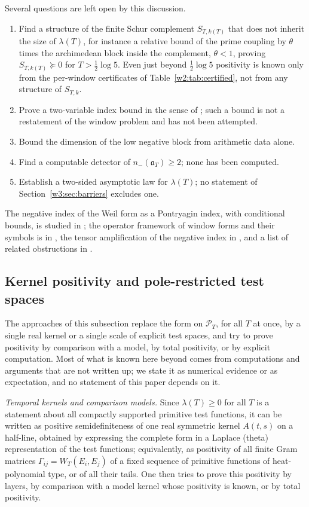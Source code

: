 \documentclass[11pt]{amsart}
\theoremstyle{definition}
\theoremstyle{remark}
\numberwithin{equation}{section}
\newcommand{\PT}{\mathcal{P}_T}                        %
\newcommand{\aT}{\mathfrak{a}_T}                       %
\newcommand{\WT}{W_T}                                  %
\newcommand{\lam}{\lambda(T)}                          %
\begin{document}
Several questions are left open by this discussion.
\begin{enumerate}[label=(\alph*)]
\item Find a structure of the finite Schur complement $S_{T,k(T)}$ that does not inherit the size of $\lam$, for
instance a relative bound of the prime coupling by $\theta$ times the archimedean block inside the complement,
$\theta<1$, proving $S_{T,k(T)}\succeq0$ for $T>\frac12\log5$. Even just beyond $\frac12\log5$ positivity is known only
from the per-window certificates of Table~\ref{w2:tab:certified}, not from any structure of $S_{T,k}$.
\item Prove a two-variable index bound in the sense of \cite{P28}; such a bound is not a restatement of the window
problem and has not been attempted.
\item Bound the dimension of the low negative block from arithmetic data alone.
\item Find a computable detector of $n_-(\aT)\ge2$; none has been computed.
\item Establish a two-sided asymptotic law for $\lam$; no statement of Section~\ref{w3:sec:barriers} excludes one.
\end{enumerate}

The negative index of the Weil form as a Pontryagin index, with conditional bounds, is studied in \cite{P11}; the
operator framework of window forms and their symbols is in \cite{P26}, the tensor amplification of the negative index
in \cite{P28}, and a list of related obstructions in \cite{P41}.

\subsection{Kernel positivity and pole-restricted test spaces}\label{w5:sec:kernels}\label{w5:fam:R9}

The approaches of this subsection replace the form on $\PT$, for all $T$ at once, by a single real kernel or a single
scale of explicit test spaces, and try to prove positivity by comparison with a model, by total positivity, or by
explicit computation. Most of what is known here beyond \cite{P46} comes from computations and arguments that are not written up; we
state it as numerical evidence or as expectation, and no statement of this paper depends on it.

\emph{Temporal kernels and comparison models.} Since $\lam\ge0$ for all $T$ is a statement about all compactly supported
primitive test functions, it can be written as positive semidefiniteness of one real symmetric kernel $A(t,s)$ on a
half-line, obtained by expressing the complete form in a Laplace (theta) representation of the test functions;
equivalently, as positivity of all finite Gram matrices $\Gamma_{ij}=\WT(E_i,E_j)$ of a fixed sequence of primitive
functions of heat-polynomial type, or of all their tails. One then tries to prove this positivity by layers, by
comparison with a model kernel whose positivity is known, or by total positivity.
\end{document}
